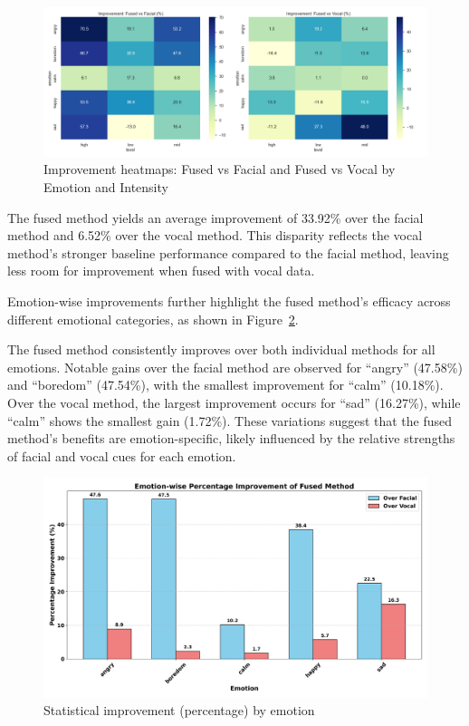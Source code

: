 \begin{figure}[H]
    \centering
    \includegraphics[width=1\textwidth]{img/chapter_04/fusion/improvement_heatmap.png}
    \caption{Improvement heatmaps: Fused vs Facial and Fused vs Vocal by Emotion and Intensity}
    \label{fig:heatmap-improvement}
\end{figure}

The fused method yields an average improvement of 33.92\% over the facial method and 6.52\% over the vocal method. This disparity reflects the vocal method’s stronger baseline performance compared to the facial method, leaving less room for improvement when fused with vocal data.
 
Emotion-wise improvements further highlight the fused method’s efficacy across different emotional categories, as shown in Figure~\ref{fig:bar-improvement}. 

The fused method consistently improves over both individual methods for all emotions. Notable gains over the facial method are observed for ``angry'' (47.58\%) and ``boredom'' (47.54\%), with the smallest improvement for ``calm'' (10.18\%). Over the vocal method, the largest improvement occurs for ``sad'' (16.27\%), while ``calm'' shows the smallest gain (1.72\%). These variations suggest that the fused method’s benefits are emotion-specific, likely influenced by the relative strengths of facial and vocal cues for each emotion.

\begin{figure}[H]
    \centering
    \includegraphics[width=1.05\textwidth]{img/chapter_04/fusion/statistical_improvement_by_emotion.png}
    \caption{Statistical improvement (percentage) by emotion}
    \label{fig:bar-improvement}
\end{figure}








